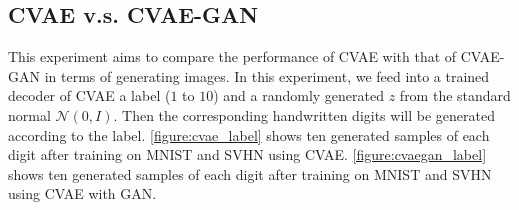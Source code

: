 \documentclass[10pt]{article}
\begin{document}
\subsection{CVAE v.s. CVAE-GAN}

This experiment aims to compare the performance of CVAE with that of CVAE-GAN in terms of generating images. In this experiment, we feed into a trained decoder of CVAE a label ($1$ to $10$) and a randomly generated $z$ from the standard normal $\mathcal{N}(0,I)$. Then the corresponding handwritten digits will be generated according to the label. \autoref{figure:cvae_label} shows ten generated samples of each digit after training on MNIST and SVHN using CVAE. \autoref{figure:cvaegan_label} shows ten generated samples of each digit after training on MNIST and SVHN using CVAE with GAN.
\end{document}
